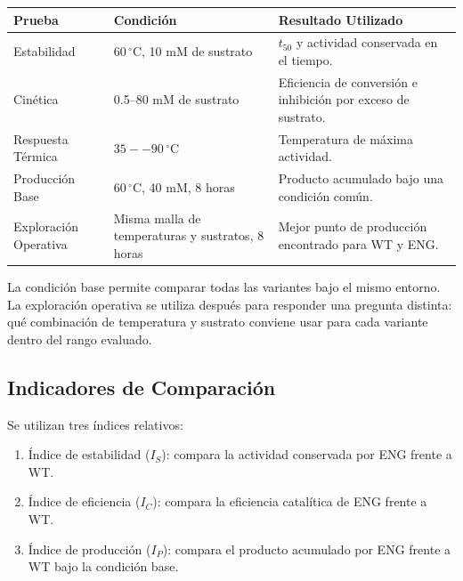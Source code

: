 \begin{table}[H]
\centering
{}



\renewcommand{\arraystretch}{1.3}

\begin{tabularx}{0.96\textwidth}{
|p{2.6cm}|
p{4.1cm}|
X|
}
\hline
Prueba & Condición & Resultado Utilizado \\ \hline

Estabilidad &
\(60\,^{\circ}\mathrm{C}\), 10 mM de sustrato &
\(t_{50}\) y actividad conservada en el tiempo. \\ \hline

Cinética &
0.5--80 mM de sustrato &
Eficiencia de conversión e inhibición por exceso de sustrato. \\ \hline

Respuesta Térmica &
\(35--90\,^{\circ}\mathrm{C}\) &
Temperatura de máxima actividad. \\ \hline

Producción Base &
\(60\,^{\circ}\mathrm{C}\), 40 mM, 8 horas &
Producto acumulado bajo una condición común. \\ \hline

Exploración Operativa &
Misma malla de temperaturas y sustratos, 8 horas &
Mejor punto de producción encontrado para WT y ENG. \\ \hline

\end{tabularx}
\end{table}

La condición base permite comparar todas las variantes bajo el mismo entorno.
La exploración operativa se utiliza después para responder una pregunta
distinta: qué combinación de temperatura y sustrato conviene usar para cada
variante dentro del rango evaluado.

\subsection{Indicadores de Comparación}
\label{subsec:indicadores}

Se utilizan tres índices relativos:

\begin{enumerate}
    \item Índice de estabilidad (\(I_S\)): compara la actividad conservada por
    ENG frente a WT.

    \item Índice de eficiencia (\(I_C\)): compara la eficiencia catalítica de
    ENG frente a WT.

    \item Índice de producción (\(I_P\)): compara el producto acumulado por ENG
    frente a WT bajo la condición base.
\end{enumerate}

